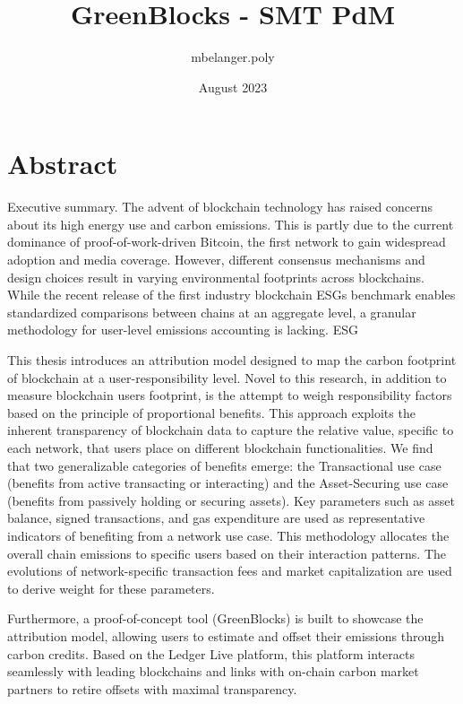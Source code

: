 \documentclass[11pt]{report}
\title{GreenBlocks - SMT PdM}
\author{mbelanger.poly}
\date{August 2023}
\begin{document}

\section*{Abstract}

Executive summary.
The advent of blockchain technology has raised concerns about its high energy use and carbon emissions. This is partly due to the current dominance of proof-of-work-driven Bitcoin, the first network to gain widespread adoption and media coverage. However, different consensus mechanisms and design choices result in varying environmental footprints across blockchains. While the recent release of the first industry blockchain \acp{ESG} benchmark enables standardized comparisons between chains at an aggregate level, a granular methodology for user-level emissions accounting is lacking. \ac{ESG} \

This thesis introduces an attribution model designed to map the carbon footprint of blockchain at a user-responsibility level. Novel to this research, in addition to measure blockchain users footprint, is the attempt to weigh responsibility factors based on the principle of proportional benefits. This approach exploits the inherent transparency of blockchain data to capture the relative value, specific to each network, that users place on different blockchain functionalities. We find that two generalizable categories of benefits emerge: the Transactional use case (benefits from active transacting or interacting) and the Asset-Securing use case (benefits from passively holding or securing assets). Key parameters such as asset balance, signed transactions, and gas expenditure are used as representative indicators of benefiting from a network use case. This methodology allocates the overall chain emissions to specific users based on their interaction patterns. The evolutions of network-specific transaction fees and market capitalization are used to derive weight for these parameters.


Furthermore, a proof-of-concept tool (GreenBlocks) is built to showcase the attribution model, allowing users to estimate and offset their emissions through carbon credits. Based on the Ledger Live platform, this platform interacts seamlessly with leading blockchains and links with on-chain carbon market partners to retire offsets with maximal transparency.
\end{document}
